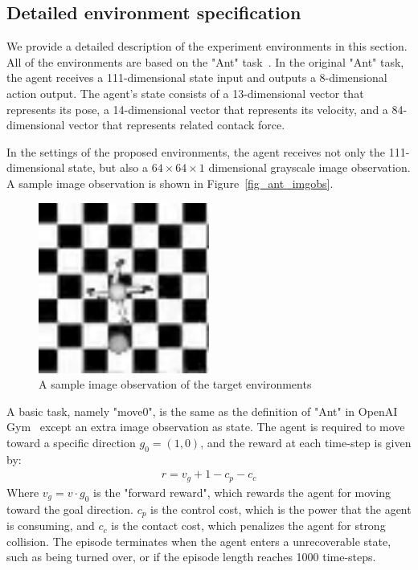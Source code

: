 
\subsection{Detailed environment specification}
We provide a detailed description of the experiment environments in this section. All of the environments are based on the "Ant" task~\cite{openaigym}. In the original "Ant" task, the agent receives a 111-dimensional state input and outputs a 8-dimensional action output. The agent's state consists of a 13-dimensional vector that represents its pose, a 14-dimensional vector that represents its velocity, and a 84-dimensional vector that represents related contack force. 

In the settings of the proposed environments, the agent receives not only the 111-dimensional state, but also a $64\times 64\times 1$ dimensional grayscale image observation. A sample image observation is shown in Figure~\ref{fig_ant_imgobs}.

\begin{figure}[H]
	\includegraphics[width=0.5\textwidth]{images/ant_imgobs.png}
	\centering
	\caption{A sample image observation of the target environments}
\end{figure}\label{fig_ant_imgobs}

A basic task, namely "move0", is the same as the definition of "Ant" in OpenAI Gym~\cite{openaigym} except an extra image observation as state. The agent is required to move toward a specific direction $g_0=(1,0)$, and the reward at each time-step is given by:
\begin{align}
r = v_g + 1-c_p-c_c
\end{align}
Where $v_g=v \cdot g_0$ is the "forward reward", which rewards the agent for moving toward the goal direction.  $c_p$ is the control cost, which is the power that the agent is consuming, and $c_c$ is the contact cost, which penalizes the agent for strong collision. The episode terminates when the agent enters a unrecoverable state, such as  being turned over, or if the episode length reaches 1000 time-steps.

